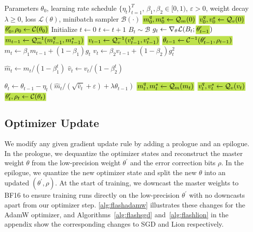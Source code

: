 \documentclass[10pt,twocolumn,letterpaper]{article}
\theoremstyle{plain}
\theoremstyle{definition}
\theoremstyle{remark}
\newcommand{\hlcolor}{SpringGreen}
\newcommand{\hlchange}[1]{{{\fboxsep=1pt\text{\colorbox{\hlcolor}{$#1$}}}}}
\newcommand{\thetalp}{\theta^\prime}
\begin{document}
\begin{algorithm}[t]
    \caption{FlashAdamW: Memory-Efficient AdamW. We \hlchange{\text{highlight}} the changes from AdamW.}
    \label{alg:flashadamw}
    \begin{algorithmic}[1]
    \Require Parameters $\theta_0$, learning rate schedule $\{\eta_t\}_{t=1}^{T}$, $\beta_1, \beta_2 \in [0,1)$, $\varepsilon > 0$, weight decay $\lambda \geq 0$, loss $\mathcal{L}(\theta)$, minibatch sampler $\mathcal{B}(\cdot)$
    \State $\hlchange{m_0^q, m_0^s \gets \mathcal{Q}_m(0)}$
    \State $\hlchange{v_0^q, v_0^s \gets \mathcal{Q}_v(0)}$
    \State $\hlchange{\thetalp_0, \rho_0 \gets \mathcal{C}(\theta_0)}$
    \State Initialize $t \gets 0$
        \State $t \gets t + 1$
        \State $B_t \sim \mathcal{B}$
        \State $g_t \gets \nabla_\theta \mathcal{L}(B_t; \hlchange{\thetalp_{t-1}})$
        \State {}
        \State $\hlchange{m_{t-1} \gets \mathcal{Q}_m^{-1}(m^q_{t-1}, m^s_{t-1})}$
        \State $\hlchange{v_{t-1} \gets \mathcal{Q}_v^{-1}(v^q_{t-1}, v^s_{t-1})}$
        \State $\hlchange{\theta_{t-1} \gets \mathcal{C}^{-1}(\thetalp_{t-1}, \rho_{t-1})}$
        \State {}
        \State $m_t \gets \beta_1 m_{t-1} + (1 - \beta_1) g_t$
        \State $v_t \gets \beta_2 v_{t-1} + (1 - \beta_2) g_t^2$
        
        \State $\hat{m}_t \gets m_t / (1 - \beta_1^t)$
        \State $\hat{v}_t \gets v_t / (1 - \beta_2^t)$
        
        \State $\theta_t \gets \theta_{t-1} - \eta_t \left( \hat{m}_t / (\sqrt{\hat{v}_t} + \varepsilon) + \lambda \theta_{t-1} \right)$
        \State {}
        \State $\hlchange{m^q_t, m^s_t \gets \mathcal{Q}_m(m_t)}$
        \State $\hlchange{v^q_t, v^s_t \gets \mathcal{Q}_v(v_t)}$
        \State $\hlchange{\thetalp_t, \rho_t \gets \mathcal{C}(\theta_t)}$
    \EndWhile
    \end{algorithmic}
    \end{algorithm}


\subsection{Optimizer Update}
\label{sub:optimizer_update}

We modify any given gradient update rule by adding a prologue and an epilogue. In the prologue, we dequantize the optimizer states and reconstruct the master weight $\theta$ from the low-precision weight $\thetalp$ and the error correction bits $\rho$. In the epilogue, we quantize the new optimizer state and split the new $\theta$ into an updated $(\thetalp, \rho)$. At the start of training, 
we downcast the master weights to BF16
to ensure training runs directly on the low-precision $\thetalp$ with no downcasts apart from our optimizer step.
\autoref{alg:flashadamw} illustrates these changes for the AdamW optimizer, and Algorithms~\ref{alg:flashsgd} and~\ref{alg:flashlion} in the appendix show the corresponding changes to SGD and Lion respectively.
\end{document}

